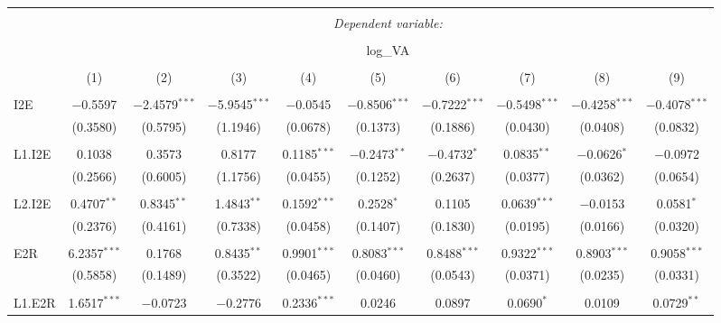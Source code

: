 
\begin{table}[!htbp] \centering 
  \caption{} 
  \label{} 
\begin{tabular}{@{\extracolsep{5pt}}lccccccccc} 
\\[-1.8ex]\hline 
\hline \\[-1.8ex] 
 & \multicolumn{9}{c}{\textit{Dependent variable:}} \\ 
\cline{2-10} 
\\[-1.8ex] & \multicolumn{9}{c}{log\_VA} \\ 
\\[-1.8ex] & (1) & (2) & (3) & (4) & (5) & (6) & (7) & (8) & (9)\\ 
\hline \\[-1.8ex] 
 I2E & $-$0.5597 & $-$2.4579$^{***}$ & $-$5.9545$^{***}$ & $-$0.0545 & $-$0.8506$^{***}$ & $-$0.7222$^{***}$ & $-$0.5498$^{***}$ & $-$0.4258$^{***}$ & $-$0.4078$^{***}$ \\ 
  & (0.3580) & (0.5795) & (1.1946) & (0.0678) & (0.1373) & (0.1886) & (0.0430) & (0.0408) & (0.0832) \\ 
  & & & & & & & & & \\ 
 L1.I2E & 0.1038 & 0.3573 & 0.8177 & 0.1185$^{***}$ & $-$0.2473$^{**}$ & $-$0.4732$^{*}$ & 0.0835$^{**}$ & $-$0.0626$^{*}$ & $-$0.0972 \\ 
  & (0.2566) & (0.6005) & (1.1756) & (0.0455) & (0.1252) & (0.2637) & (0.0377) & (0.0362) & (0.0654) \\ 
  & & & & & & & & & \\ 
 L2.I2E & 0.4707$^{**}$ & 0.8345$^{**}$ & 1.4843$^{**}$ & 0.1592$^{***}$ & 0.2528$^{*}$ & 0.1105 & 0.0639$^{***}$ & $-$0.0153 & 0.0581$^{*}$ \\ 
  & (0.2376) & (0.4161) & (0.7338) & (0.0458) & (0.1407) & (0.1830) & (0.0195) & (0.0166) & (0.0320) \\ 
  & & & & & & & & & \\ 
 E2R & 6.2357$^{***}$ & 0.1768 & 0.8435$^{**}$ & 0.9901$^{***}$ & 0.8083$^{***}$ & 0.8488$^{***}$ & 0.9322$^{***}$ & 0.8903$^{***}$ & 0.9058$^{***}$ \\ 
  & (0.5858) & (0.1489) & (0.3522) & (0.0465) & (0.0460) & (0.0543) & (0.0371) & (0.0235) & (0.0331) \\ 
  & & & & & & & & & \\ 
 L1.E2R & 1.6517$^{***}$ & $-$0.0723 & $-$0.2776 & 0.2336$^{***}$ & 0.0246 & 0.0897 & 0.0690$^{*}$ & 0.0109 & 0.0729$^{**}$ \\ 

\end{tabular}
\end{table}
